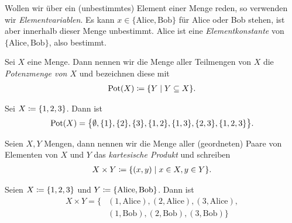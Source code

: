 \begin{bspn}
\begin{enumerate}
    \end{enumerate}      

    Wollen wir über ein (unbestimmtes) Element einer Menge reden, so
    verwenden wir \emph{Elementvariablen}. Es kann
    $x \in \{ \text{Alice}, \text{Bob} \}$ für Alice oder Bob stehen, ist
    aber innerhalb dieser Menge unbestimmt. Alice ist eine
    \emph{Elementkonstante} von $\{ \text{Alice}, \text{Bob} \}$, also
    bestimmt.

\end{bspn}


\begin{definn}

  Sei $X$ eine Menge. Dann nennen wir die Menge aller Teilmengen von $X$
  die \emph{Potenzmenge von $X$} und bezeichnen diese mit
  \begin{align*}
    \operatorname{Pot}(X) \coloneqq \{ Y \mid Y\subseteq X\}.
  \end{align*}

\end{definn}


\begin{bspn}

  Sei $X \coloneqq \{ 1, 2, 3 \}$. Dann ist
  \begin{align*}
    \operatorname{Pot}(X) = \big\{ \emptyset, \{  1 \}, \{ 2 \}, \{ 3 \}, 
     \{ 1,2 \}, \{ 1,3 \}, \{ 2,3 \}, 
     \{ 1,2,3 \} \big\}.
  \end{align*}

\end{bspn}


\begin{definn}

  Seien $X,Y$ Mengen, dann nennen wir die Menge aller (geordneten) Paare
  von Elementen von $X$ und $Y$ das \emph{kartesische Produkt} und
  schreiben
  \begin{align*}
    X \times Y \coloneqq \{ (x,y) \mid x\in X, y\in Y \}.
  \end{align*}
  
\end{definn}


\begin{bspn}

  Seien $X \coloneqq \{ 1, 2, 3 \}$ und $Y \coloneqq \{ \text{Alice}, \text{Bob}
  \}$. Dann ist
  \begin{align*}
    X \times Y = \big\{ &(1, \text{Alice}), (2, \text{Alice}), (3,\text{Alice}), \\
    &(1, \text{Bob}), (2, \text{Bob}), (3, \text{Bob}) \big\}
  \end{align*}
  
\end{bspn}


